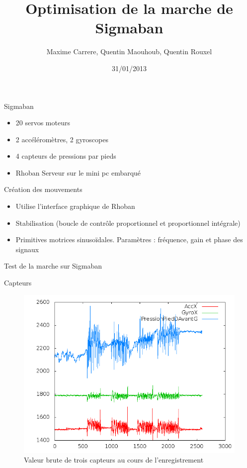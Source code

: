 \documentclass{beamer}
\title[Projet Robotique Autonome]{Optimisation de la marche de Sigmaban}
\author{Maxime Carrere, Quentin Maouhoub, Quentin Rouxel}
\institute{}
\date{31/01/2013}
\begin{document}
\begin{frame}
    \titlepage
\end{frame}

\begin{frame}{Sigmaban}
    \begin{itemize}
        \item 20 servos moteurs
        \item 2 accéléromètres, 2 gyroscopes
        \item 4 capteurs de pressions par pieds
        \item Rhoban Serveur sur le mini pc embarqué
    \end{itemize}
\end{frame}

\begin{frame}{Création des mouvements}
    \begin{itemize}
        \item Utilise l'interface graphique de Rhoban
        \item Stabilisation (boucle de contrôle proportionnel et proportionnel intégrale)
        \item Primitives motrices sinusoïdales. Paramètres : fréquence, gain et phase des signaux
    \end{itemize}
\end{frame}

\begin{frame}{Test de la marche sur Sigmaban}
\end{frame}

\begin{frame}{Capteurs}
    \begin{figure}[h]
        \includegraphics[scale=0.4]{../report/sensors.png}
        \caption{Valeur brute de trois capteurs au cours de l'enregistrement}
    \end{figure}
\end{frame}
\end{document}

